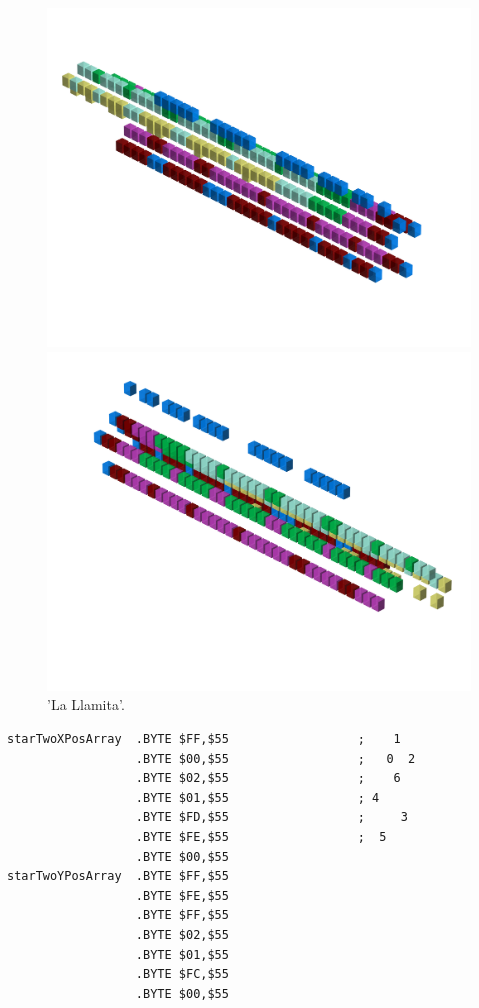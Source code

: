 \begin{figure}[H]
    \centering
    \begin{adjustbox}{width=12cm,center}
      \includegraphics[width=12cm]{src/patterns/pattern3-45.png}%
    \end{adjustbox}
    \begin{adjustbox}{width=12cm,margin=0cm -4cm}
      \includegraphics[width=12cm]{src/patterns/pattern3-225.png}%
    \end{adjustbox}
\caption{'La Llamita'.}
\end{figure}
\clearpage

\begin{lstlisting}
starTwoXPosArray  .BYTE $FF,$55                  ;    1  
                  .BYTE $00,$55                  ;   0  2
                  .BYTE $02,$55                  ;    6  
                  .BYTE $01,$55                  ; 4     
                  .BYTE $FD,$55                  ;     3 
                  .BYTE $FE,$55                  ;  5    
                  .BYTE $00,$55
starTwoYPosArray  .BYTE $FF,$55
                  .BYTE $FE,$55
                  .BYTE $FF,$55
                  .BYTE $02,$55
                  .BYTE $01,$55
                  .BYTE $FC,$55
                  .BYTE $00,$55
\end{lstlisting}



